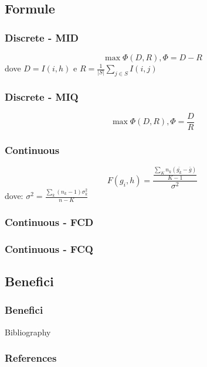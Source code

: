 \documentclass{beamer}
\begin{document}
\subsection{Formule}
\begin{frame}
	\frametitle{Discrete - MID}
	$$\max \Phi(D,R), \Phi = D - R$$
	dove $D=I(i,h)$ e $R=\frac{1}{|S|}\sum\limits_{j \in S}I(i,j)$
\end{frame}

\begin{frame}
	\frametitle{Discrete - MIQ}
	$$\max \Phi(D,R), \Phi = \frac{D}{R}$$
\end{frame}
\begin{frame}
	\frametitle{Continuous}
	$$ F(g_i,h) = \frac{\frac{\sum\limits_{K}{n_k(\bar{g_k}-\bar{g})}}{K-1}}{\sigma^2}$$
	dove: $\sigma^2=\frac{ \sum\limits_{k}{(n_k-1)\sigma^2_k}}{n-K}$
\end{frame}
\begin{frame}
	\frametitle{Continuous - FCD}
\end{frame}

\begin{frame}
	\frametitle{Continuous - FCQ}
\end{frame}

\subsection{Benefici}
\begin{frame}
	\frametitle{Benefici}
\end{frame}

\begin{frame}{Bibliography}
	\frametitle{References}
	
	
\end{frame}
\end{document}
